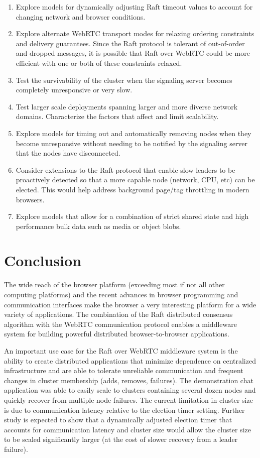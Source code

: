 \documentclass[conference,compsoc]{./IEEEtran/IEEEtran}
\begin{document}
\begin{enumerate}
\item Explore models for dynamically adjusting Raft timeout values to account for changing network and browser conditions.
\item Explore alternate WebRTC transport modes for relaxing ordering constraints and delivery guarantees. Since the Raft protocol is tolerant of out-of-order and dropped messages, it is possible that Raft over WebRTC could be more efficient with one or both of these constraints relaxed.
\item Test the survivability of the cluster when the signaling server becomes completely unresponsive or very slow.
\item Test larger scale deployments spanning larger and more diverse network domains. Characterize the factors that affect and limit scalability.
\item Explore models for timing out and automatically removing nodes when they become unresponsive without needing to be notified by the signaling server that the nodes have disconnected.
\item Consider extensions to the Raft protocol that enable slow leaders to be proactively detected so that a more capable node (network, CPU, etc) can be elected. This would help address background page/tag throttling in modern browsers.
\item Explore models that allow for a combination of strict shared state and high performance bulk data such as media or object blobs.
\end{enumerate}


\section{Conclusion}

The wide reach of the browser platform (exceeding most if not all other computing platforms) and the recent advances in browser programming and communication interfaces make the browser a very interesting platform for a wide variety of applications. The combination of the Raft distributed consensus algorithm with the WebRTC communication protocol enables a middleware system for building powerful distributed browser-to-browser applications.

An important use case for the Raft over WebRTC middleware system is the ability to create distributed applications that minimize dependence on centralized infrastructure and are able to tolerate unreliable communication and frequent changes in cluster membership (adds, removes, failures). The demonstration chat application was able to easily scale to clusters containing several dozen nodes and quickly recover from multiple node failures. The current limitation in cluster size is due to communication latency relative to the election timer setting. Further study is expected to show that a dynamically adjusted election timer that accounts for communication latency and cluster size would allow the cluster size to be scaled significantly larger (at the cost of slower recovery from a leader failure).
\end{document}
